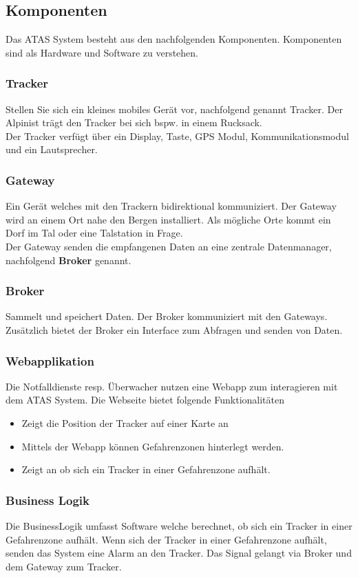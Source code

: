 \documentclass[11pt,english,german]{report}
\theoremstyle{definition}
\begin{document}
\subsection{Komponenten}
Das ATAS System besteht aus den nachfolgenden Komponenten. Komponenten sind als Hardware und Software zu verstehen.
\subsubsection{Tracker}
Stellen Sie sich ein kleines mobiles Gerät vor, nachfolgend genannt Tracker. Der Alpinist trägt den Tracker bei sich bspw. in einem Rucksack.\bigskip \\ 
Der Tracker verfügt über ein Display, Taste, GPS Modul, Kommunikationsmodul und ein Lautsprecher.

\subsubsection{Gateway}
Ein Gerät welches mit den Trackern bidirektional kommuniziert. Der Gateway wird an einem Ort nahe den Bergen installiert. Als mögliche Orte kommt ein Dorf im Tal oder eine Talstation in Frage.\bigskip \\
Der Gateway senden die empfangenen Daten an eine zentrale Datenmanager, nachfolgend \textbf{Broker} genannt.

\subsubsection{Broker}
Sammelt und speichert Daten. Der Broker kommuniziert mit den Gateways. Zusätzlich bietet der Broker ein Interface zum Abfragen und senden von Daten.

\subsubsection{Webapplikation}
Die Notfalldienste resp. Überwacher nutzen eine Webapp zum interagieren mit dem ATAS System. Die Webseite bietet folgende Funktionalitäten
\begin{itemize}
	\item
		Zeigt die Position der Tracker auf einer Karte an 
	\item
		Mittels der Webapp können Gefahrenzonen hinterlegt werden.
	\item 
		Zeigt an ob sich ein Tracker in einer Gefahrenzone aufhält.	
\end{itemize}

\subsubsection{Business Logik}
Die BusinessLogik umfasst Software welche berechnet, ob sich ein Tracker in einer Gefahrenzone aufhält. Wenn sich der Tracker in einer Gefahrenzone aufhält, senden das System eine Alarm an den Tracker. Das Signal gelangt via Broker und dem Gateway zum Tracker.
\end{document}
